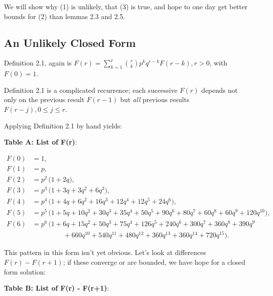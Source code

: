 \documentclass[11pt, oneside]{article} 	%
\begin{document}
We will show why (1) is unlikely, that (3) is true, and hope to one day get better bounds for (2) than lemmas 2.3 and 2.5.

\subsection{An Unlikely Closed Form}

Definition 2.1, again is $F(r) = \sum_{k = 1}^r {r \choose k}p^kq^{r-k} F(r-k), r > 0$, with $F(0) = 1$.


Definition 2.1 is a complicated recurrence; each successive $F(r)$ depends not only on the previous result $F(r-1)$ but \textit{all} previous results $F(r-j), 0 \leq j \leq r$.

Applying Definition 2.1 by hand yields:

\textbf{Table A: List of F(r)}:

\[
\begin{aligned}
F(0) &= 1, \\[6pt]
F(1) &= p, \\[6pt]
F(2) &= p^{2}\,\bigl(1 + 2q \bigr), \\[6pt]
F(3) &= p^{3}\,\bigl(1 + 3q + 3q^{2} + 6q^{3} \bigr), \\[6pt]
F(4) &= p^{4}\,\bigl(1 + 4q + 6q^{2} + 16q^{3} + 12q^{4} + 12q^{5} + 24q^{6} \bigr), \\[6pt]
F(5) &= p^{5}\,\bigl(1 + 5q + 10q^{2} + 30q^{3} + 35q^{4} + 50q^{5} + 90q^{6} + 80q^{7} + 60q^{8} + 60q^{9} + 120q^{10} \bigr), \\[6pt]
F(6) &= p^{6}\,\bigl(1 + 6q + 15q^{2} + 50q^{3} + 75q^{4} + 126q^{5} + 240q^{6} + 300q^{7} + 360q^{8} + 390q^{9} \\
&\qquad\qquad\;\; + 660q^{10} + 540q^{11} + 480q^{12} + 360q^{13} + 360q^{14} + 720q^{15} \bigr).
\end{aligned}
\]

This pattern in this form isn't yet obvious.  Let's look at differences $F(r) - F(r+1)$; if these converge or are bounded, we have hope for a closed form solution:

\textbf{Table B: List of F(r) - F(r+1)}:
\end{document}
